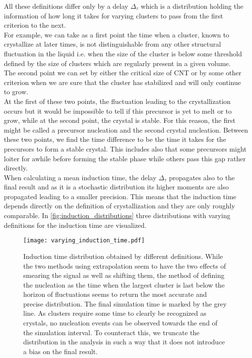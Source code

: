 All these definitions differ only by a delay $\Delta_{\tau}$ which is a distribution holding the information of how long it takes for varying clusters to pass from the first criterion to the next.\\
For example, we can take as a first point the time when a cluster, known to crystallize at later times, is not distinguishable from any other structural fluctuation in the liquid i.e. when the size of the cluster is below some threshold defined by the size of clusters which are regularly present in a given volume.\\
The second point we can set by either the critical size of CNT or by some other criterion when we are sure that the cluster has stabilized and will only continue to grow.\\
At the first of these two points, the fluctuation leading to the crystallization occurs but it would be impossible to tell if this precursor is yet to melt or to grow, while at the second point, the crystal is stable. For this reason, the first might be called a precursor nucleation and the second crystal nucleation. Between these two points, we find the time difference to be the time it takes for the precursors to form a stable crystal. This includes also that some precursors might loiter for awhile before forming the stable phase while others pass this gap rather directly.\\

When calculating a mean induction time, the delay $\Delta_{\tau}$ propagates also to the final result and as it is a stochastic distribution its higher moments are also propagated leading to a smaller precision. This means that the induction time depends directly on the definition of crystallization and they are only roughly comparable. In \autoref{fig:induction_distributions} three distributions with varying definitions for the induction time are visualized.

\begin{figure}[!h]
\centering
\texttt{[image: varying\_induction\_time.pdf]}
\caption[Comparison of different definitions for the induction time]{Induction time distribution obtained by different definitions. While the two methods using extrapolation seem to have the two effects of smearing the signal as well as shifting them, the method of defining the nucleation as the time when the largest cluster is last below the horizon of fluctuations seems to return the most accurate and precise distribution. The final simulation time is marked by the grey line. As clusters require some time to clearly be recognized as crystals, no nucleation events can be observed towards the end of the simulation interval. To counteract this, we truncate the distribution in the analysis in such a way that it does not introduce a bias on the final result.}
\label{fig:induction_distributions}
\end{figure}

